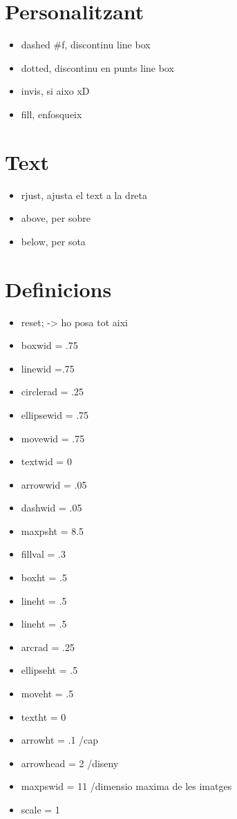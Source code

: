 \section{Personalitzant}
\begin{itemize}
\item dashed #f, discontinu
	\subitem line
	\subitem box
\item dotted, discontinu en punts
	\subitem line
	\subitem box
\item invis, si aixo xD
\item fill, enfosqueix
\end{itemize}

\section{Text}
\begin{itemize}
\item rjust, ajusta el text a la dreta
\item above, per sobre
\item below, per sota
\end{itemize}

\section{Definicions}
\begin{itemize}
\item reset; -> ho posa tot aixi
\item boxwid = .75
\item linewid =.75
\item circlerad = .25
\item ellipsewid = .75
\item movewid = .75
\item textwid = 0
\item arrowwid = .05
\item dashwid = .05
\item maxpsht = 8.5
\item fillval = .3
\item boxht = .5
\item lineht = .5
\item lineht = .5
\item arcrad = .25
\item ellipseht = .5
\item moveht = .5
\item textht = 0
\item arrowht = .1 /cap
\item arrowhead = 2 /diseny
\item maxpswid = 11 /dimensio maxima de les imatges
\item scale = 1
\end{itemize}
